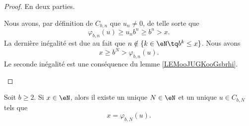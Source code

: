 \begin{proof}
	En deux parties.
	\begin{subproof}
		\spitem[Si \( n>N\)]
		Nous avons, par définition de \( C_{b,n}\) que \( u_n\neq 0\), de telle sorte que
		\begin{equation}
			\varphi_{b,n}(u)\geq u_nb^n\geq b^n>x .
		\end{equation}
		La dernière inégalité est due au fait que \( n\notin \{ k\in \eN\tq b^k\leq x \}\).
		\spitem[Si \( n<N\)]
		Nous avons
		\begin{equation}
			x\geq b^N> \varphi_{b,n}(u).
		\end{equation}
		Le seconde inégalité est une conséquence du lemme \ref{LEMooJUGKooGsbrhi}.
	\end{subproof}
\end{proof}

\begin{theorem}	\label{THMooUniciteEcritureChiffres}
	Soit \( b\geq 2\). Si \( x\in \eN\), alors il existe un unique \( N\in \eN\) et un unique \( u\in C_{b,N} \) tels que
	\begin{equation}
		x=\varphi_{b,N}(u).
	\end{equation}
\end{theorem}

